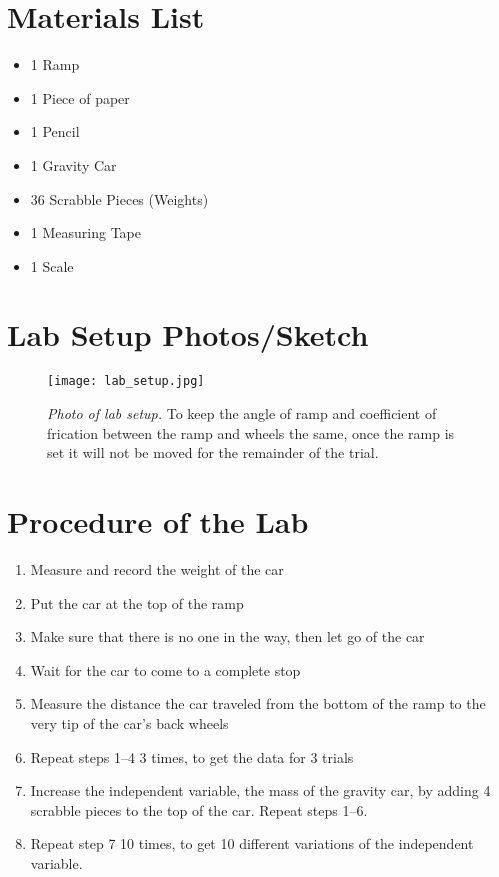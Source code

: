 \documentclass[12pt]{article}
\begin{document}
\section{Materials List}

\begin{itemize}
	\item 1 Ramp
	\item 1 Piece of paper
	\item 1 Pencil
	\item 1 Gravity Car
	\item 36 Scrabble Pieces (Weights)
	\item 1 Measuring Tape
	\item 1 Scale
\end{itemize}

\section{Lab Setup Photos/Sketch}

\begin{figure}[H]
	\centering
	\texttt{[image: lab\_setup.jpg]}
	\caption{\textit{Photo of lab setup.} To keep the angle of ramp and coefficient of frication between the ramp and wheels the same, once the ramp is set it will not be moved for the remainder of the trial.}
\end{figure}

\section{Procedure of the Lab}

\begin{enumerate}
	\item Measure and record the weight of the car
	\item Put the car at the top of the ramp
	\item Make sure that there is no one in the way, then let go of the car
	\item Wait for the car to come to a complete stop
	\item Measure the distance the car traveled from the bottom of the ramp to the very tip of the car's back wheels
	\item Repeat steps 1--4 3 times, to get the data for 3 trials
	\item Increase the independent variable, the mass of the gravity car, by adding 4 scrabble pieces to the top of the car. Repeat steps 1--6.
	\item Repeat step 7 10 times, to get 10 different variations of the independent variable.
\end{enumerate}
\end{document}
